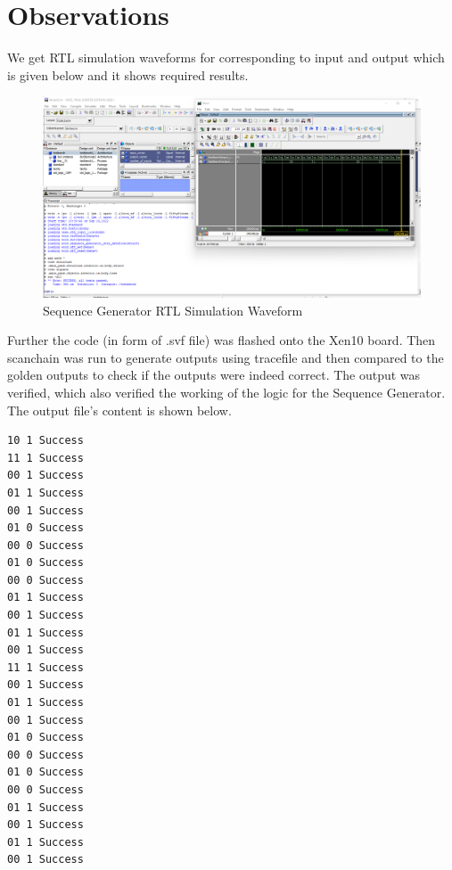 \documentclass[12pt]{article}
\begin{document}
\section{Observations}
 
We get RTL simulation waveforms for corresponding to input and output which is given below and it shows required results.

\begin{figure}[H]
\centering
  \includegraphics[scale=0.35]{Images/SeqGen_RTLSimulation.png}
  \caption{Sequence Generator RTL Simulation Waveform}
\end{figure}

Further the code (in form of .svf file) was flashed onto the Xen10 board. Then scanchain was run to generate outputs using tracefile and then compared to the golden outputs to check if the outputs were indeed correct. The output was verified, which also verified the working of the logic for the Sequence Generator. The output file's content is shown below.

\begin{verbatim}
10 1 Success
11 1 Success
00 1 Success
01 1 Success
00 1 Success
01 0 Success
00 0 Success
01 0 Success
00 0 Success
01 1 Success
00 1 Success
01 1 Success
00 1 Success
11 1 Success
00 1 Success
01 1 Success
00 1 Success
01 0 Success
00 0 Success
01 0 Success
00 0 Success
01 1 Success
00 1 Success
01 1 Success
00 1 Success
\end{verbatim}
\end{document}
